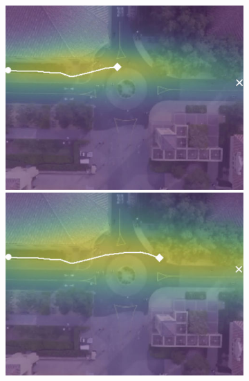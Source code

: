 \documentclass[letterpaper,10pt,conference]{ieeetran}
\begin{document}
\begin{figure}[t!]
\begin{subfigure}[t]{0.48\textwidth}
\begin{minipage}[c]{0.3\linewidth}
	\end{minipage}
	\begin{minipage}[c]{0.3\linewidth}
		\includegraphics[width=\linewidth]{./figures/comparison/ours_death_1_2_t=250.jpg}
	\end{minipage}
	\begin{minipage}[c]{0.3\linewidth}
		\includegraphics[width=\linewidth]{./figures/comparison/ours_death_1_2_t=370.jpg}
	\end{minipage}
	

\end{subfigure}
\end{figure}
\end{document}
